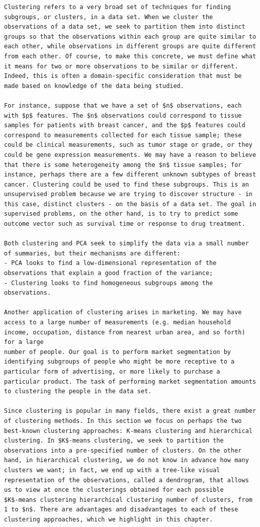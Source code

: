 \documentclass[10pt]{article}
\begin{document}
\begin{verbatim}
Clustering refers to a very broad set of techniques for finding subgroups, or clusters, in a data set. When we cluster the observations of a data set, we seek to partition them into distinct groups so that the observations within each group are quite similar to each other, while observations in different groups are quite different from each other. Of course, to make this concrete, we must define what it means for two or more observations to be similar or different. Indeed, this is often a domain-specific consideration that must be made based on knowledge of the data being studied.

For instance, suppose that we have a set of $n$ observations, each with $p$ features. The $n$ observations could correspond to tissue samples for patients with breast cancer, and the $p$ features could correspond to measurements collected for each tissue sample; these could be clinical measurements, such as tumor stage or grade, or they could be gene expression measurements. We may have a reason to believe that there is some heterogeneity among the $n$ tissue samples; for instance, perhaps there are a few different unknown subtypes of breast cancer. Clustering could be used to find these subgroups. This is an unsupervised problem because we are trying to discover structure - in this case, distinct clusters - on the basis of a data set. The goal in supervised problems, on the other hand, is to try to predict some outcome vector such as survival time or response to drug treatment.

Both clustering and PCA seek to simplify the data via a small number of summaries, but their mechanisms are different:
- PCA looks to find a low-dimensional representation of the observations that explain a good fraction of the variance;
- Clustering looks to find homogeneous subgroups among the observations.

Another application of clustering arises in marketing. We may have access to a large number of measurements (e.g. median household income, occupation, distance from nearest urban area, and so forth) for a large
number of people. Our goal is to perform market segmentation by identifying subgroups of people who might be more receptive to a particular form of advertising, or more likely to purchase a particular product. The task of performing market segmentation amounts to clustering the people in the data set.

Since clustering is popular in many fields, there exist a great number of clustering methods. In this section we focus on perhaps the two best-known clustering approaches: K-means clustering and hierarchical clustering. In $K$-means clustering, we seek to partition the observations into a pre-specified number of clusters. On the other hand, in hierarchical clustering, we do not know in advance how many clusters we want; in fact, we end up with a tree-like visual representation of the observations, called a dendrogram, that allows us to view at once the clusterings obtained for each possible
$K$-means clustering hierarchical clustering number of clusters, from 1 to $n$. There are advantages and disadvantages to each of these clustering approaches, which we highlight in this chapter.


\end{verbatim}
\end{document}
